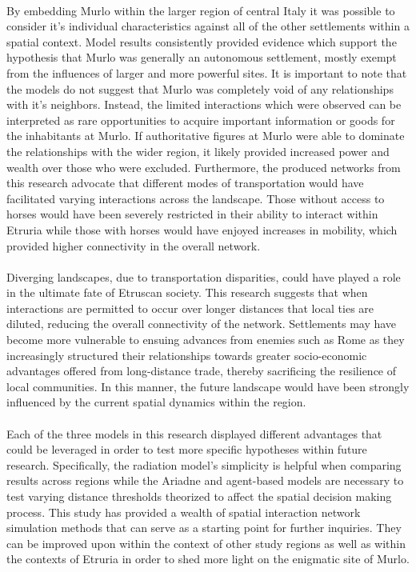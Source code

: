 \documentclass[12pt,a4paper]{thesis}
\begin{document}
\paragraph{} 
By embedding Murlo within the larger region of central Italy it was possible to consider it's individual characteristics against all of the other settlements within a spatial context. Model results consistently provided evidence which support the hypothesis that Murlo was generally an autonomous settlement, mostly exempt from the influences of larger and more powerful sites. It is important to note that the models do not suggest that Murlo was completely void of any relationships with it's neighbors. Instead, the limited interactions which were observed can be interpreted as rare opportunities to acquire important information or goods for the inhabitants at Murlo. If authoritative figures at Murlo were able to dominate the relationships with the wider region, it likely provided increased power and wealth over those who were excluded. Furthermore, the produced networks from this research advocate that different modes of transportation would have facilitated varying interactions across the landscape. Those without access to horses would have been severely restricted in their ability to interact within Etruria while those with horses would have enjoyed increases in mobility, which provided higher connectivity in the overall network.         

 
\paragraph{}
Diverging landscapes, due to transportation disparities, could have played a role in the ultimate fate of Etruscan society. This research suggests that when interactions are permitted to occur over longer distances that local ties are diluted, reducing the overall connectivity of the network. Settlements may have become more vulnerable to ensuing advances from enemies such as Rome as they increasingly structured their relationships towards greater socio-economic advantages offered from long-distance trade, thereby sacrificing the resilience of local communities. In this manner, the future landscape would have been strongly influenced by the current spatial dynamics within the region.    


\paragraph{}
Each of the three models in this research displayed different advantages that could be leveraged in order to test more specific hypotheses within future research. Specifically, the radiation model's simplicity is helpful when comparing results across regions while the Ariadne and agent-based models are necessary to test varying distance thresholds theorized to affect the spatial decision making process. This study has provided a wealth of spatial interaction network simulation methods that can serve as a starting point for further inquiries. They can be improved upon within the context of other study regions as well as within the contexts of Etruria in order to shed more light on the enigmatic site of Murlo. 
\end{document}
